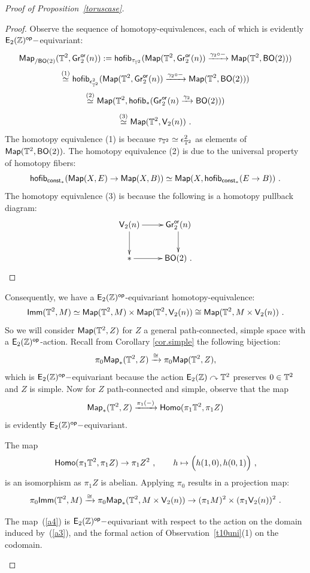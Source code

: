 \begin{proof}[Proof of Proposition~\ref{toruscase}]
\begin{proof}
Observe the sequence of homotopy-equivalences, each of which is evidently \newline $\mathsf E_2(\mathbb Z)^{\operatorname{\mathsf{op}}}-$equivariant:
\[
{\sf Map}_{/{\sf BO}(2)}(\mathbb T^{2}, \operatorname{\sf Gr}_2^{\sf or}(n)) := {\sf hofib}_{\tau_{\mathbb T^{2}}}({\sf Map}(\mathbb T^{2}, \operatorname{\sf Gr}_2^{\sf or}(n)) \xrightarrow{\gamma_{2} \circ -} {\sf Map}(\mathbb T^{2}, {\sf BO}(2)))
\]
\[
\overset{(1)} \simeq {\sf hofib}_{\epsilon^{2}_{\mathbb T^{2}}}({\sf Map}(\mathbb T^{2}, \operatorname{\sf Gr}_2^{\sf or}(n)) \xrightarrow{\gamma_{2} \circ -} {\sf Map}(\mathbb T^{2}, {\sf BO}(2)))
\]
\[
\overset{(2)} \simeq {\sf Map}(\mathbb T^{2}, {\sf hofib}_{\ast}(\operatorname{\sf Gr}_2^{\sf or}(n) \xrightarrow{\gamma_{2}} {\sf BO}(2)))
\]
\[
\overset{(3)} \simeq {\sf Map}(\mathbb T^{2}, \mathsf V_{2}(n))~.
\]
The homotopy equivalence (1) is because $\tau_{\mathbb T^{2}} \simeq \epsilon^{2}_{\mathbb T^{2}}$ as elements of ${\sf Map}(\mathbb T^{2}, {\sf BO}(2)).$ The homotopy equivalence (2) is due to the universal property of homotopy fibers:
\[
{\sf hofib}_{{\sf const}_{\ast}}({\sf Map}(X, E) \rightarrow {\sf Map}(X, B)) \simeq {\sf Map}(X, {\sf hofib}_{{\sf const}_{\ast}}(E \rightarrow B))~.
\]
The homotopy equivalence (3) is because the following is a homotopy pullback diagram:
\[
\xymatrix{
\sV_{2}(n) \ar[r] \ar[d]
&
\Gr_2^{\sf or}(n) \ar[d]
\\
\ast \ar[r]
&
{\sf BO}(2) ~.
}
\] 
\end{proof}
Consequently, we have a $\mathsf E_2(\mathbb Z)^{\operatorname{\mathsf{op}}}$-equivariant homotopy-equivalence: 
\[
{\sf Imm}(\mathbb T^{2}, M) \simeq {\sf Map}(\mathbb T^{2}, M) \times  {\sf Map}(\mathbb T^{2}, \mathsf V_{2}(n)) \cong  {\sf Map}(\mathbb T^{2}, M \times \mathsf V_{2}(n))~.
\] 
So we will consider $ {\sf Map}(\mathbb T^{2}, Z)$ for $Z$ a general path-connected, simple space with a $\mathsf E_2(\mathbb Z)^{\operatorname{\mathsf{op}}}$-action.
Recall from Corollary \ref{cor.simple} the following bijection:
\[
\pi_{0}{\sf Map}_{\ast}(\mathbb T^{2}, Z) \xrightarrow{\cong} \pi_{0}{\sf Map}(\mathbb T^{2}, Z),
\]
which is $\mathsf E_2(\mathbb Z)^{\operatorname{\mathsf{op}}}-$equivariant because the action ${\sf E}_{2}(\mathbb Z) \curvearrowright \mathbb T^{2}$ preserves $0 \in \mathbb T^{2}$ and $Z$ is simple.
Now for $Z$ path-connected and simple, observe that the map
\[
{\sf Map}_{\ast}(\mathbb T^{2}, Z) \xrightarrow{\pi_{1}(-)} {\sf Homo}(\pi_{1}\mathbb T^{2}, \pi_{1}Z) 
\]
is evidently $\mathsf E_2(\mathbb Z)^{\operatorname{\mathsf{op}}}-$equivariant.

The map 
\[
{\sf Homo}(\pi_{1}\mathbb T^{2}, \pi_{1}Z) \rightarrow \pi_{1}Z^{2}
~, \qquad h \mapsto \Bigl(h(1, 0), h(0, 1)\Bigr)
~,
\]
is an isomorphism as $\pi_{1}Z$ is abelian.
Applying $\pi_{0}$ results in a projection map:
\begin{equation}
\label{a4}
\pi_{0}{\sf Imm}(\mathbb T^{2}, M) \xrightarrow{\cong} \pi_{0}{\sf Map}_{\ast}(\mathbb T^{2}, M \times \mathsf V_{2}(n)) \rightarrow (\pi_{1}M)^{2} \times (\pi_{1}\mathsf V_{2}(n))^{2}
~.
\end{equation}
\begin{claim}
The map~(\ref{a4}) is $\mathsf E_2(\mathbb Z)^{\operatorname{\mathsf{op}}}-$equivariant with respect to the action on the domain induced by~(\ref{a3}), and the formal action of Observation~\ref{t10uni}(1) on the codomain.


\end{claim}
\end{proof}
